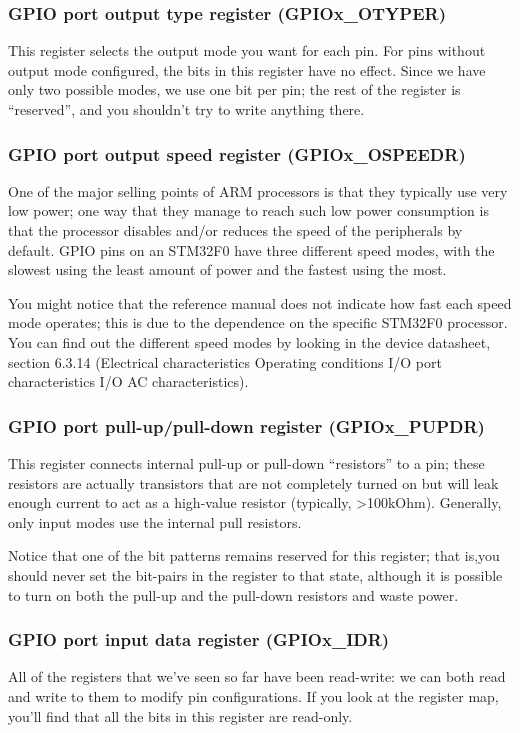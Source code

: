 \documentclass[openany,11pt,fleqn]{book} %
\begin{document}
\subsubsection{GPIO port output type register (GPIOx\_OTYPER)}
This register selects the output mode you want for each pin. For pins without output mode configured, the bits in this register have no effect. Since we have only two possible modes, we use one bit per pin; the rest of the register is ``reserved'', and you shouldn't try to write anything there.

\subsubsection{GPIO port output speed register (GPIOx\_OSPEEDR)}
One of the major selling points of ARM processors is that they typically use very low power; one way that they manage to reach such low power consumption is that the processor disables and/or reduces the speed of the peripherals by default. GPIO pins on an STM32F0 have three different speed modes, with the slowest using the least amount of power and the fastest using the most.

You might notice that the reference manual does not indicate how fast each speed mode operates; this is due to the dependence on the specific STM32F0 processor. You can find out the different speed modes by looking in the device datasheet, section 6.3.14 (Electrical characteristics \textrightarrow Operating conditions \textrightarrow I/O port characteristics \textrightarrow I/O AC characteristics).

\subsubsection{GPIO port pull-up/pull-down register (GPIOx\_PUPDR)}
This register connects internal pull-up or pull-down ``resistors'' to a pin; these resistors are actually transistors that are not completely turned on but will leak enough current to act as a high-value resistor (typically, >100kOhm). Generally, only input modes use the internal pull resistors.

Notice that one of the bit patterns remains reserved for this register; that is,you should never set the bit-pairs in the register to that state, although it is possible to turn on both the pull-up and the pull-down resistors and waste power.

\subsubsection{GPIO port input data register (GPIOx\_IDR)}
All of the registers that we've seen so far have been read-write: we can both read and write to them to modify pin configurations. If you look at the register map, you'll find that all the bits in this register are read-only.
\end{document}
